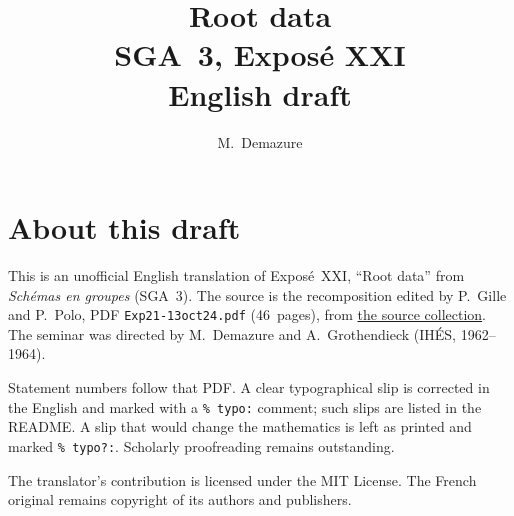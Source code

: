 \documentclass[11pt,a4paper,oneside]{amsbook}
\title[SGA~3, Expos\'e XXI (English draft)]{Root data\\
{\normalsize SGA~3, Expos\'e XXI\\English draft}}
\author{M.\ Demazure}
\date{}
\begin{document}
\frontmatter
\maketitle

\chapter*{About this draft}
This is an unofficial English translation of Expos\'e~XXI, ``Root data''
from \textit{Sch\'emas en groupes} (SGA~3).
The source is the recomposition edited by P.~Gille and P.~Polo,
PDF \texttt{Exp21-13oct24.pdf} (46~pages),
from \href{https://webusers.imj-prg.fr/~patrick.polo/SGA3/}{the source collection}.
The seminar was directed by M.~Demazure and A.~Grothendieck
(IH\'ES, 1962--1964).

Statement numbers follow that PDF. A clear typographical slip is
corrected in the English and marked with a \texttt{\% typo:} comment;
such slips are listed in the README. A slip that would change the
mathematics is left as printed and marked \texttt{\% typo?:}.
Scholarly proofreading remains outstanding.

The translator's contribution is licensed under the MIT License.
The French original remains copyright of its authors and publishers.

\tableofcontents
\mainmatter








\end{document}
